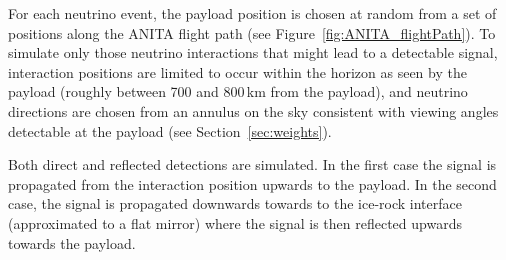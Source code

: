 For each neutrino event, the payload position is chosen at random from a set of positions along the ANITA flight path (see Figure~\ref{fig:ANITA_flightPath}).
To simulate only those neutrino interactions that might lead to a detectable signal, interaction positions are limited to occur within the horizon as seen by the payload (roughly between 700 and 800\,km from the payload), and neutrino directions are chosen from an annulus on the sky consistent with viewing angles detectable at the payload (see Section~\ref{sec:weights}).


Both direct and reflected detections are simulated.
In the first case the signal is propagated from the interaction position upwards to the payload. In the second case, the signal is propagated downwards
towards to the ice-rock interface (approximated to a flat mirror)
where the signal is then reflected upwards towards the payload. 




